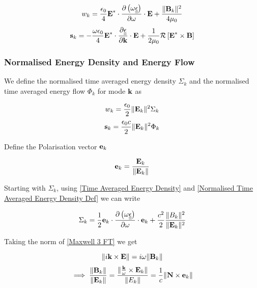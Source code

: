 \begin{equation} \label{Time Averaged Energy Density}
	w_k = \frac{\epsilon_0}{4} \textbf{E}^* \cdot \frac{\partial \left( \omega \underline{\underline{\epsilon}} \right)}{\partial \omega} \cdot \textbf{E} + \frac{\|\textbf{B}_k\|^2}{4 \mu_0}
\end{equation}
\begin{equation} \label{Time Averaged Energy Flow}
	\textbf{s}_k = - \frac{\omega \epsilon_0}{4} \textbf{E}^* \cdot \frac{\partial \underline{\underline{\epsilon}}}{\partial \textbf{k}} \cdot \textbf{E} + \frac{1}{2 \mu_0} \mathcal{R} \left[ \textbf{E}^* \times \textbf{B} \right]
\end{equation}

\subsubsection{Normalised Energy Density and Energy Flow}
We define the normalised time averaged energy density $\Sigma_k$ and the normalised time averaged energy flow $\Phi_k$ for mode $\textbf{k}$ as

\begin{equation} \label{Normalised Time Averaged Energy Density Def}
	w_k = \frac{\epsilon_0}{2} \|\textbf{E}_k\|^2 \Sigma_k
\end{equation}
\begin{equation} \label{Normalised Time Averaged Energy Flow Def}
	\textbf{s}_k = \frac{\epsilon_0 c}{2} \|\textbf{E}_k\|^2 \Phi_k
\end{equation}

Define the Polarisation vector $\textbf{e}_k$

\begin{equation}
	\textbf{e}_k = \frac{\textbf{E}_k}{\|\textbf{E}_k\|}
\end{equation}

Starting with $\Sigma_k$, using \eqref{Time Averaged Energy Density} and \eqref{Normalised Time Averaged Energy Density Def} we can write

\begin{equation}
	\Sigma_k = \frac{1}{2} \textbf{e}_k \cdot \frac{\partial \left( \omega \underline{\underline{\epsilon}} \right)}{\partial \omega} \cdot \textbf{e}_k + \frac{c^2}{2} \frac{\|B_k\|^2}{\|\textbf{E}_k\|^2}
\end{equation}

Taking the norm of \eqref{Maxwell 3 FT} we get

\begin{equation*}
	\|i \textbf{k} \times \textbf{E}\| = i \omega \|\textbf{B}_k\|
\end{equation*}
\begin{equation}
	\implies \frac{\|\textbf{B}_k\|}{\|\textbf{E}_k\|} = \frac{\|\frac{\textbf{k}}{\omega} \times \textbf{E}_k\|}{\|E_k\|} = \frac{1}{c} \|\textbf{N} \times \textbf{e}_k\|
\end{equation}

